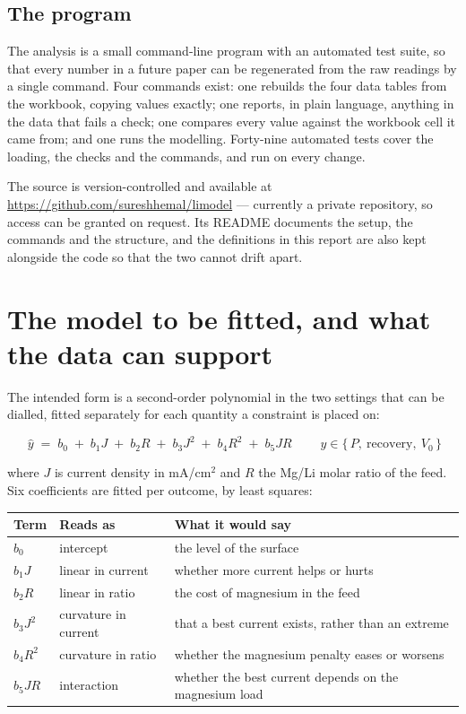\documentclass[11pt,a4paper]{article}
\begin{document}
\subsection{The program}

The analysis is a small command-line program with an automated test suite, so that every
number in a future paper can be regenerated from the raw readings by a single command. Four
commands exist: one rebuilds the four data tables from the workbook, copying values exactly;
one reports, in plain language, anything in the data that fails a check;
one compares every value against the workbook cell it came from; and one runs the modelling.
Forty-nine automated tests cover the loading, the checks and the commands, and run on every
change.

The source is version-controlled and available at
\url{https://github.com/sureshhemal/limodel} --- currently a private repository, so access can
be granted on request. Its README documents the setup, the commands and the structure, and the
definitions in this report are also kept alongside the code so that the two cannot drift apart.

\section{The model to be fitted, and what the data can support}
\label{sec:limits}

The intended form is a second-order polynomial in the two settings that can be dialled,
fitted separately for each quantity a constraint is placed on:

\begin{equation}
\boxed{\;
\hat{y} \;=\; b_0 \;+\; b_1 J \;+\; b_2 R \;+\; b_3 J^2 \;+\; b_4 R^2 \;+\; b_5 JR
\;}
\qquad y \in \{\,P,\ \text{recovery},\ V_0\,\}
\end{equation}

where $J$ is current density in mA/cm$^2$ and $R$ the Mg/Li molar ratio of the feed. Six
coefficients are fitted per outcome, by least squares:

\begin{center}
\small
\begin{tabular}{@{}l l l@{}}
\toprule
Term & Reads as & What it would say \\
\midrule
$b_0$ & intercept & the level of the surface \\
$b_1 J$ & linear in current & whether more current helps or hurts \\
$b_2 R$ & linear in ratio & the cost of magnesium in the feed \\
$b_3 J^2$ & curvature in current & that a best current exists, rather than an extreme \\
$b_4 R^2$ & curvature in ratio & whether the magnesium penalty eases or worsens \\
$b_5 JR$ & interaction & whether the best current depends on the magnesium load \\
\bottomrule
\end{tabular}
\end{center}
\end{document}
